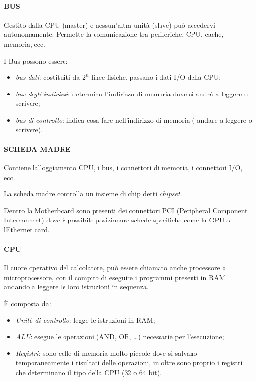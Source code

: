 \paragraph{BUS}\label{bus}

Gestito dalla CPU (master) e nessun'altra unità (slave) può accedervi
autonomamente. Permette la comunicazione tra periferiche, CPU, cache,
memoria, ecc.

I Bus possono essere:

\begin{itemize}
\item
  \emph{bus dati}: costituiti da \(2^{n}\) linee fisiche, passano i dati
  I/O della CPU;
\item
  \emph{bus degli indirizzi}: determina l'indirizzo di memoria dove si
  andrà a leggere o scrivere;
\item
  \emph{bus di controllo}: indica cosa fare nell'indirizzo di memoria (
  andare a leggere o scrivere).
\end{itemize}

\paragraph{SCHEDA MADRE}\label{scheda-madre}

Contiene l\textquotesingle alloggiamento CPU, i bus, i connettori di
memoria, i connettori I/O, ecc.

La scheda madre controlla un insieme di chip detti \emph{chipset}.

Dentro la Motherboard sono presenti dei connettori PCI (Peripheral
Component Interconnect) dove è possibile posizionare schede specifiche
come la GPU o l\textquotesingle Ethernet card.

\paragraph{CPU}\label{cpu}

Il cuore operativo del calcolatore, può essere chiamato anche processore
o microprocessore, con il compito di eseguire i programmi presenti in
RAM andando a leggere le loro istruzioni in sequenza.

È composta da:

\begin{itemize}
\item
  \emph{Unità di controllo}: legge le istruzioni in RAM;
\item
  \emph{ALU}: esegue le operazioni (AND, OR, \ldots) necessarie per
  l'esecuzione;
\item
  \emph{Registri}: sono celle di memoria molto piccole dove si salvano
  temporaneamente i risultati delle operazioni, in oltre sono proprio i
  registri che determinano il tipo della CPU (32 o 64 bit).
\end{itemize}

